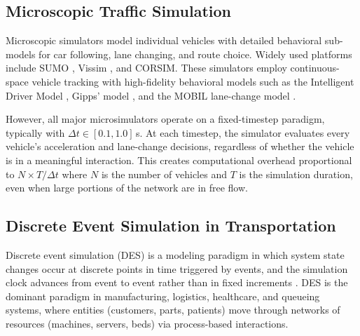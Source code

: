 \documentclass[review,number]{elsarticle} %
\begin{document}
\subsection{Microscopic Traffic Simulation}
\label{sec:lit_microsim}

Microscopic simulators model individual vehicles with detailed behavioral sub-models for car following, lane changing, and route choice. Widely used platforms include SUMO \citep{lopez2018microscopic}, Vissim \citep{fellendorf2010microscopic}, and CORSIM. These simulators employ continuous-space vehicle tracking with high-fidelity behavioral models such as the Intelligent Driver Model \citep[IDM;][]{treiber2000congested}, Gipps' model \citep{gipps1981behavioural}, and the MOBIL lane-change model \citep{kesting2007general}.

However, all major microsimulators operate on a fixed-timestep paradigm, typically with $\Delta t \in [0.1, 1.0]$\,s. At each timestep, the simulator evaluates every vehicle's acceleration and lane-change decisions, regardless of whether the vehicle is in a meaningful interaction. This creates computational overhead proportional to $N \times T / \Delta t$ where $N$ is the number of vehicles and $T$ is the simulation duration, even when large portions of the network are in free flow.

\subsection{Discrete Event Simulation in Transportation}
\label{sec:lit_des}

Discrete event simulation (DES) is a modeling paradigm in which system state changes occur at discrete points in time triggered by events, and the simulation clock advances from event to event rather than in fixed increments \citep{banks2010discrete}. DES is the dominant paradigm in manufacturing, logistics, healthcare, and queueing systems, where entities (customers, parts, patients) move through networks of resources (machines, servers, beds) via process-based interactions.
\end{document}
